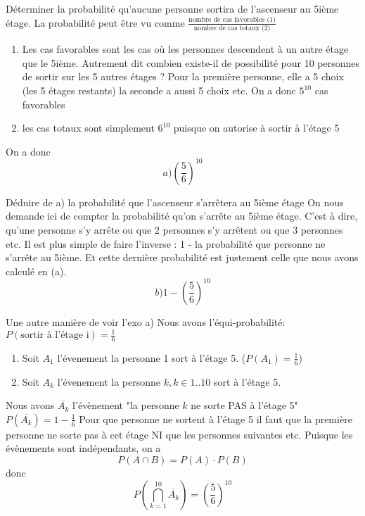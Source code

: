 \begin{exo}
  \begin{subexo} {Déterminer la probabilité qu’aucune personne sortira de l’ascenseur au 5ième étage.}
    La probabilité peut être vu comme $\frac{\text{nombre de cas favorables (1)}}{\text{nombre de cas totaux (2)}}$

      \begin{enumerate}[label=(\arabic*)]
        \item Les cas favorables sont les cas où les personnes descendent à un autre étage que le 5ième.
        Autrement dit combien existe-il de possibilité pour 10 personnes de sortir sur les 5 autres étages ?
        Pour la première personne, elle a 5 choix (les 5 étages restants) la seconde a aussi 5 choix etc.
        On a donc $5^{10}$ cas favorables
        \item les cas totaux sont simplement $6^{10}$ puisque on autorise à sortir à l'étage 5
      \end{enumerate}
      On a donc $$a) \left(\frac{5}{6}\right)^{10}$$

  \end{subexo}
  \begin{subexo}{Déduire de a) la probabilité que l'ascenseur s'arrêtera au 5ième étage}
      On nous demande ici de compter la probabilité qu'on s'arrête au 5ième étage. C'est à dire, qu'une personne s'y arrête ou que 2 personnes s'y arrêtent ou que 3 personnes etc.
    Il est plus simple de faire l'inverse : 1 - la probabilité que personne ne s'arrête au 5ième. Et cette dernière probabilité est justement celle que nous avons calculé en (a).
    $$b)1 - \left( \dfrac{5}{6} \right)^{10}$$
    \end{subexo}
  \begin{subexo}{Une autre manière de voir l'exo a)}
    Nous avons l'équi-probabilité: $ P({\text{sortir à l'étage i}}) = \frac{1}{6}$
    \begin{enumerate}
      \item 			Soit $A_1$ l'évenement la personne 1 sort à l'étage 5. ($P(A_1) = \frac{1}{6}$)
\item 			Soit $A_k$ l'évenement la personne $k, k\in 1..10$ sort à l'étage 5.

    \end{enumerate}
    Nous avons $\overline{A_k}$ l'évènement "la personne $k$ ne sorte PAS à l'étage 5" $P(\overline{A_k}) = 1 -\frac{1}{6}$
    Pour que personne ne sortent à l'étage 5 il faut que la première personne ne sorte pas à cet étage NI que les personnes suivantes etc.
    \newline
    Puisque les évènements sont indépendants, on a $$P(A \cap B) =P(A) \cdot{ P(B)} $$
    donc $$ P\left( \bigcap_{k=1}^{10}\overline{A_{k}}\right) = \left(\frac{5}{6}\right)^{10}$$
  \end{subexo}
\end{exo}
